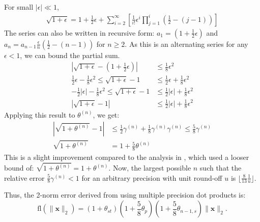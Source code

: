 \documentclass{article}
\newcommand{\tth}{\theta}
\newcommand{\bb}[1]{\mathbf{#1}}
\newcommand{\fl}{\mathrm{fl}}
\theoremstyle{definition}
\begin{document}
For small $|\epsilon|\ll 1$, 
\begin{align*}
    \sqrt{1+\epsilon} = 1 + \frac{1}{2}\epsilon + \sum_{i=2}^\infty \left[\frac{1}{i!}\epsilon^i\prod_{j=1}^i\left(\frac{1}{2}-(j-1)\right)\right]
\end{align*}
The series can also be written in recursive form: $a_1 = (1+\frac{1}{2}\epsilon)$ and $a_n=a_{n-1}\frac{\epsilon}{n}\left(\frac{1}{2}-(n-1)\right)$ for $n\geq 2$.
As this is an alternating series for any $\epsilon < 1$, we can bound the partial sum. 
\begin{align*}
    \left|\sqrt{1+\epsilon}-(1+\frac{1}{2}\epsilon)\right|&\leq \frac{1}{8}\epsilon^2 \\
    \frac{1}{2}\epsilon - \frac{1}{8}\epsilon^2 \leq \sqrt{1+\epsilon} -1 & \leq \frac{1}{2}\epsilon + \frac{1}{8}\epsilon^2 \\
    -\frac{1}{2}|\epsilon| - \frac{1}{8}\epsilon^2 \leq \sqrt{1+\epsilon} -1 & \leq \frac{1}{2}|\epsilon| + \frac{1}{8}\epsilon^2 \\
     \left|\sqrt{1+\epsilon}-1\right| &\leq \frac{1}{2}|\epsilon| + \frac{1}{8}\epsilon^2
\end{align*}
Applying this result to $\tth^{(n)}$, we get: 
\begin{align*}
    |\sqrt{1+\tth^{(n)}}-1| &\leq \frac{1}{2}\gamma^{(n)} + \frac{1}{8}\gamma^{(n)}\gamma^{(n)} \leq \frac{5}{8}\gamma^{(n)}\\
    \sqrt{1+\tth^{(n)}} &= 1 + \frac{5}{8}\tth^{(n)}
\end{align*}
This is a slight improvement compared to the analysis in \cite{Higham2002}, which used a looser bound of: $\sqrt{1+\tth^{(n)}} = 1 + \tth^{(n)}$.
Now, the largest possible $n$ such that the relative error $\frac{5}{8}\gamma^{(n)} < 1$ for an arbitrary precision with unit round-off $u$ is $\lfloor\frac{8}{13}\frac{1}{u}\rfloor$. 

Thus, the 2-norm error derived from using multiple precision dot products is:
\begin{equation}
    \fl(\|\bb{x}\|_2) = (1+\tth_{st})(1+\frac{5}{8}\tth_p)(1+\frac{5}{8}\tth_{n-1,s})\|\bb{x}\|_2.
\end{equation}
\end{document}
